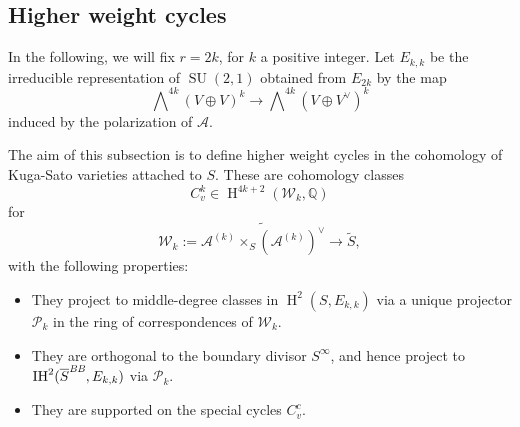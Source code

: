 \documentclass[12pt,a4paper,reqno]{amsart}
\theoremstyle{definition}
\numberwithin{definition}{subsection}
\theoremstyle{definition}
\numberwithin{Definition}{subsection}
\theoremstyle{remark}
\theoremstyle{remark}
\numberwithin{Remark}{subsection}
\theoremstyle{remark}
\theoremstyle{plain}
\numberwithin{Theorem}{subsection}
\theoremstyle{plain}
\theoremstyle{plain}
\theoremstyle{plain}
\theoremstyle{plain}
\theoremstyle{plain}
\theoremstyle{plain}
\theoremstyle{plain}
\newcommand*{\Z}{\mathbb{Z}}
\newcommand*{\Q}{\mathbb{Q}}
\DeclareMathOperator{\SU}{SU}
\DeclareMathOperator{\h}{H}
\begin{document}
\subsection{Higher weight cycles}
In the following, we will fix $r=2k$, for $k$ a positive integer.
Let $E_{k,k}$ be the irreducible representation of $\SU(2,1)$ obtained from $E_{2k}$ by the map
\[
\bigwedge\nolimits^{4k}(V\oplus V)^k\to \bigwedge\nolimits^{4k}(V\oplus V^\vee)^k
\]
induced by the polarization of $\mathcal{A}$.

The aim of this subsection is to define higher weight cycles in the cohomology of Kuga-Sato varieties attached to $S$. These are cohomology classes
\[
C^k_v\in \h^{4k+2}(\mathcal{W}_k,\Q)
\] 
for 
\[
\mathcal{W}_k:=\widetilde{\mathcal{A}^{(k)}\times_{S} (\mathcal{A}^{(k)})^\vee}\to \tilde{S},
\]
with the following properties:
\begin{itemize}
\item They project to middle-degree classes in $\h^2(S,E_{k,k})$ via a unique projector $\mathcal{P}_k$ in the ring of correspondences of $\mathcal{W}_k$.
\item They are orthogonal to the boundary divisor $S^\infty$, and hence project to $\text{IH}^2(\overline{S}^{\emph{BB}},E_{k,k})$ via $\mathcal{P}_k$.
\item They are supported on the special cycles $C_v^c$.
\end{itemize}
\end{document}
